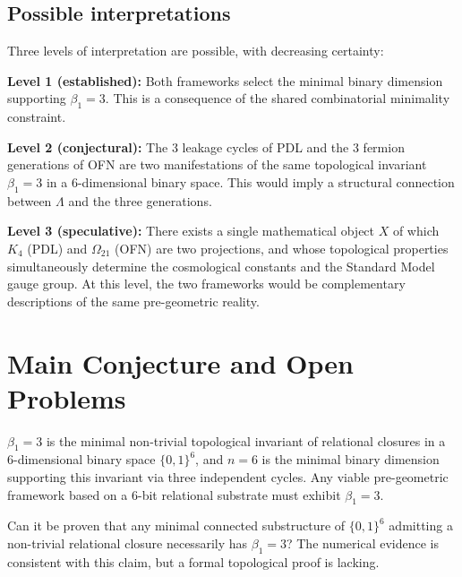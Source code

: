 \documentclass[11pt,a4paper]{article}
\begin{document}
\subsection{Possible interpretations}

Three levels of interpretation are possible, with decreasing certainty:

\textbf{Level 1 (established):} Both frameworks select the minimal binary dimension supporting $\beta_1 = 3$. This is a consequence of the shared combinatorial minimality constraint.

\textbf{Level 2 (conjectural):} The 3 leakage cycles of PDL and the 3 fermion generations of OFN are two manifestations of the same topological invariant $\beta_1 = 3$ in a 6-dimensional binary space. This would imply a structural connection between $\Lambda$ and the three generations.

\textbf{Level 3 (speculative):} There exists a single mathematical object $X$ of which $K_4$ (PDL) and $\Omega_{21}$ (OFN) are two projections, and whose topological properties simultaneously determine the cosmological constants and the Standard Model gauge group. At this level, the two frameworks would be complementary descriptions of the same pre-geometric reality.

\section{Main Conjecture and Open Problems}
\label{sec:conjecture}

\begin{conjecture_box}[label={conj:main}]
$\beta_1 = 3$ is the minimal non-trivial topological invariant of relational closures in a 6-dimensional binary space $\{0,1\}^6$, and $n = 6$ is the minimal binary dimension supporting this invariant via three independent cycles. Any viable pre-geometric framework based on a 6-bit relational substrate must exhibit $\beta_1 = 3$.
\end{conjecture_box}

\begin{open_box}[title={OP-1: Formal proof of Conjecture~\ref{conj:main}}]
Can it be proven that any minimal connected substructure of $\{0,1\}^6$ admitting a non-trivial relational closure necessarily has $\beta_1 = 3$? The numerical evidence is consistent with this claim, but a formal topological proof is lacking.
\end{open_box}
\end{document}
